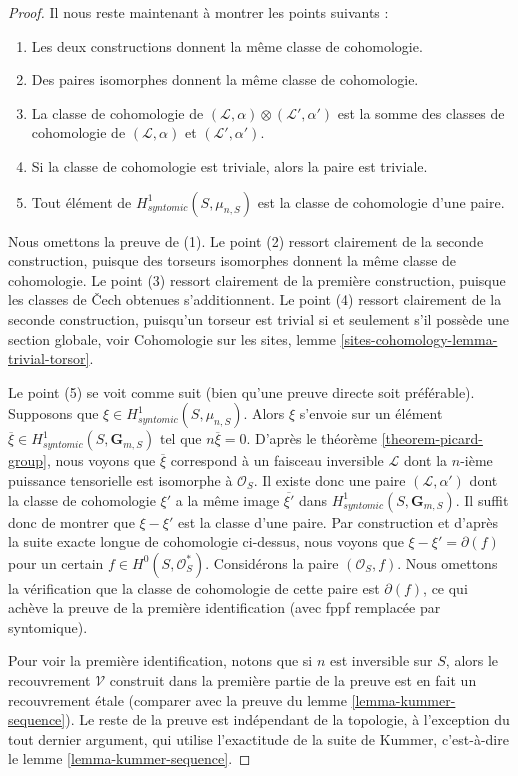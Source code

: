 \begin{proof}
\medskip\noindent
Il nous reste maintenant \`a montrer les points suivants :
\begin{enumerate}
\item Les deux constructions donnent la m\^eme classe de cohomologie.
\item Des paires isomorphes donnent la m\^eme classe de cohomologie.
\item La classe de cohomologie de
$(\mathcal{L}, \alpha) \otimes (\mathcal{L}', \alpha')$
est la somme des classes de cohomologie de
$(\mathcal{L}, \alpha)$ et $(\mathcal{L}', \alpha')$.
\item Si la classe de cohomologie est triviale, alors la paire est triviale.
\item Tout \'el\'ement de $H^1_{syntomic}(S, \mu_{n, S})$ est la
classe de cohomologie d'une paire.
\end{enumerate}
Nous omettons la preuve de (1). Le point (2) ressort clairement de la seconde construction,
puisque des torseurs isomorphes donnent la m\^eme classe de cohomologie.
Le point (3) ressort clairement de la premi\`ere construction, puisque les classes de
{\v C}ech obtenues s'additionnent. Le point (4) ressort clairement de la seconde construction,
puisqu'un torseur est trivial si et seulement s'il poss\`ede une section globale, voir
Cohomologie sur les sites, lemme \ref{sites-cohomology-lemma-trivial-torsor}.

\medskip\noindent
Le point (5) se voit comme suit (bien qu'une preuve directe soit
pr\'ef\'erable). Supposons que $\xi \in H^1_{syntomic}(S, \mu_{n, S})$.
Alors $\xi$ s'envoie sur un \'el\'ement
$\overline{\xi} \in H^1_{syntomic}(S, \mathbf{G}_{m, S})$
tel que $n \overline{\xi} = 0$. D'apr\`es le
th\'eor\`eme \ref{theorem-picard-group},
nous voyons que $\overline{\xi}$ correspond \`a un faisceau inversible $\mathcal{L}$
dont la $n$-i\`eme puissance tensorielle est isomorphe \`a $\mathcal{O}_S$.
Il existe donc une paire $(\mathcal{L}, \alpha')$ dont la classe de cohomologie
$\xi'$ a la m\^eme image $\overline{\xi'}$ dans
$H^1_{syntomic}(S, \mathbf{G}_{m, S})$. Il suffit donc de montrer
que $\xi - \xi'$ est la classe d'une paire. Par construction et d'apr\`es la
suite exacte longue de cohomologie ci-dessus, nous voyons que
$\xi - \xi' = \partial(f)$ pour un certain $f \in H^0(S, \mathcal{O}_S^*)$.
Consid\'erons la paire $(\mathcal{O}_S, f)$. Nous omettons la v\'erification
que la classe de cohomologie de cette paire est $\partial(f)$, ce qui
ach\`eve la preuve de la premi\`ere identification (avec fppf remplac\'ee
par syntomique).

\medskip\noindent
Pour voir la premi\`ere identification, notons que si $n$ est inversible sur $S$, alors le
recouvrement $\mathcal{V}$ construit dans la premi\`ere partie de la preuve
est en fait un recouvrement \'etale (comparer avec la preuve du
lemme \ref{lemma-kummer-sequence}). Le reste de la preuve est ind\'ependant
de la topologie, \`a l'exception du tout dernier argument, qui utilise l'exactitude de
la suite de Kummer, c'est-\`a-dire le lemme \ref{lemma-kummer-sequence}.
\end{proof}






